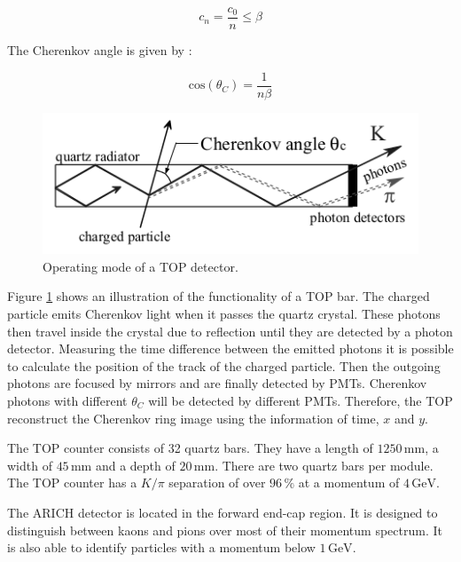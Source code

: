 \documentclass[a4paper,11pt,twosided,final,german,openbib,pdftex,listof=totoc,bibliography=totoc]{scrbook}
\begin{document}
\begin{equation}
c_n = \frac{c_0}{n} \leq \beta	
\end{equation}

The Cherenkov angle is given by \cite{cerenkovAngle}:

\begin{equation}
\textrm{cos}(\theta_C)=\frac{1}{n\beta}
\end{equation}

\begin{figure}[h!]
	\centering
	\includegraphics[width=12cm]{Bilder/TOP}
	\caption[TOP Principle]{Operating mode of a TOP detector.\cite{B2TR}}
	\label{fig:TOP}
\end{figure}

Figure \ref{fig:TOP} shows an illustration of the functionality of a TOP bar. The charged particle emits Cherenkov light when it passes the quartz crystal. These photons then travel inside the crystal due to reflection until they are detected by a photon detector. Measuring the time difference between the emitted photons it is possible to calculate the position of the track of the charged particle. Then the outgoing photons are focused by mirrors and are finally detected by PMTs. Cherenkov photons with different $\theta_C$ will be detected by different PMTs. Therefore, the TOP reconstruct the Cherenkov ring image using the information of time, $x$ and $y$.\cite{B2TR} 

The TOP counter consists of 32 quartz bars. They have a length of $1250\,\textrm{mm}$, a width of $45\,\textrm{mm}$ and a depth of $20\,\textrm{mm}$. There are two quartz bars per module. The TOP counter has a $K/\pi$ separation of over $96\,\%$ at a momentum of $4\,\textrm{GeV}$.\cite{B2TR}

The ARICH detector is located in the forward end-cap region. It is designed to distinguish between kaons and pions over most of their momentum spectrum. It is also able to identify particles with a momentum below $1\,\textrm{GeV}$.
\end{document}
